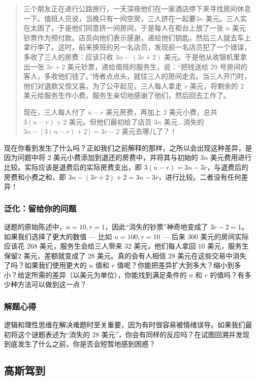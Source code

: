 \begin{quote}
    三个朋友正在进行公路旅行，一天深夜他们在一家酒店停下来寻找房间休息一下。值班人员说，当晚只有一间空房，三人挤在一起要$3n$ 美元。三人实在太困了，于是他们同意挤一间房间，于是每人在柜台上放了一张 $n$ 美元钞票作为预付款。店员向他们表示感谢，递给他们钥匙，然后三人就去车上拿行李了。这时，前来换班的另一名店员，发现前一名店员犯了一个错误，多收了三人的房费：应该只收 $3n - (3r + 2)$ 美元。于是他从收银机里拿出一张 $3r + 2$ 美元钞票，递给值班的服务生，说：``把钱送给 29 号房间的客人，多收他们钱了。''侍者点点头，就往三人的房间走去。当三人开门时，他们对退款又惊又喜。为了公平起见，三人每人拿走 $r$ 美元，将剩余的 $2$ 美元给服务生作小费。服务生亲切地感谢了他们，然后回去工作了。

    现在，三人每人付了 $n-r$ 美元房费，再加上 $2$ 美元小费，总共 $3(n-r)+2$ 美元。但他们最初给了店员 $3n$ 美元...消失的 $3n - [3(n - r) + 2]=3r - 2$ 美元去哪儿了？！
\end{quote}

现在你看到发生了什么吗？正如我们之前解释的那样，之所以会出现这种差异，是因为问题中将 $2$ 美元小费添加到退还的房费中，并将其与初始的 $3n$ 美元费用进行比较。实际应该是退费后的实际房费支出，即 $3(n-r) = 3n - 3r$，与退费后的房费和小费之和，即 $3n-(3r+2)+2 = 3n-3r$，进行比较。二者没有任何差异！

\subsubsection*{泛化：留给你的问题}

谜题的原始陈述中，$n=10, r=1$，因此``消失的钞票''神奇地变成了 $3r-2=1$。如果我们选择了更大的数值 --- 比如 $n=100, r=10$ --- 后来 $300$ 美元的房间实际应该花 $268$ 美元，服务生会给三人带来 $32$ 美元，他们每人拿回 $10$ 美元，服务生保留$2$ 美元，差额就变成了 $28$ 美元。真的会有人相信 $28$ 美元在这些交易中消失了吗？如果我们使用更大的 $n$ 值和 $r$ 值呢？你能把差异扩大到多大？缩小到多小？给定所需的差异（以美元为单位），你能找到满足条件的 $n$ 和 $r$ 的值吗？有多少种方法可以做到这一点？

\subsubsection*{解题心得}

逻辑和理性思维在解决难题时至关重要，因为有时很容易被情绪误导。如果我们最初将这个谜题表述为``消失的 $28$ 美元''，你会有同样的反应吗？在试图回溯并发现到底发生了什么之前，你是否会短暂地感到困惑？

\subsection{高斯驾到}\label{sec:section1.4.2}

